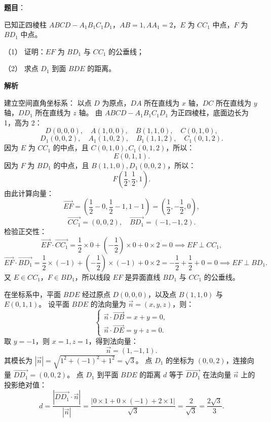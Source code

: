 \begin{answer}

\textbf{题目}：

已知正四棱柱 $ABCD - A_1B_1C_1D_1$，$AB = 1, AA_1 = 2$，$E$ 为 $CC_1$ 中点，$F$ 为 $BD_1$ 中点。

（1） 证明：$EF$ 为 $BD_1$ 与 $CC_1$ 的公垂线；

（2） 求点 $D_1$ 到面 $BDE$ 的距离。
\nopagebreak[4]
\begin{center}\end{center}
\nopagebreak[4]
\textbf{解析}


建立空间直角坐标系：
以点 $D$ 为原点，$DA$ 所在直线为 $x$ 轴，$DC$ 所在直线为 $y$ 轴，$DD_1$ 所在直线为 $z$ 轴。
由 $ABCD - A_1B_1C_1D_1$ 为正四棱柱，底面边长为 1，高为 2：
\nopagebreak[4]
\[D(0, 0, 0), \quad A(1, 0, 0), \quad B(1, 1, 0), \quad C(0, 1, 0),\]
\nopagebreak[4]
\[D_1(0, 0, 2), \quad A_1(1, 0, 2), \quad B_1(1, 1, 2), \quad C_1(0, 1, 2).\]
因为 $E$ 为 $CC_1$ 的中点，且 $C(0, 1, 0), C_1(0, 1, 2)$，所以：
\nopagebreak[4]
\[E(0, 1, 1).\]
因为 $F$ 为 $BD_1$ 的中点，且 $B(1, 1, 0), D_1(0, 0, 2)$，所以：
\nopagebreak[4]
\[F\left(\frac{1}{2}, \frac{1}{2}, 1\right).\]
由此计算向量：
\nopagebreak[4]
\[\vec{EF} = \left(\frac{1}{2} - 0, \frac{1}{2} - 1, 1 - 1\right) = \left(\frac{1}{2}, -\frac{1}{2}, 0\right),\]
\nopagebreak[4]
\[\vec{CC_1} = (0, 0, 2), \quad \vec{BD_1} = (-1, -1, 2).\]
检验正交性：
\nopagebreak[4]
\[\vec{EF} \cdot \vec{CC_1} = \frac{1}{2} \times 0 + \left(-\frac{1}{2}\right) \times 0 + 0 \times 2 = 0 \implies EF \perp CC_1,\]
\nopagebreak[4]
\[\vec{EF} \cdot \vec{BD_1} = \frac{1}{2} \times (-1) + \left(-\frac{1}{2}\right) \times (-1) + 0 \times 2 = -\frac{1}{2} + \frac{1}{2} + 0 = 0 \implies EF \perp BD_1.\]
又 $E \in CC_1$，$F \in BD_1$，所以线段 $EF$ 是异面直线 $BD_1$ 与 $CC_1$ 的公垂线。


在坐标系中，平面 $BDE$ 经过原点 $D(0, 0, 0)$，以及点 $B(1, 1, 0)$ 与 $E(0, 1, 1)$。
设平面 $BDE$ 的法向量为 $\vec{n} = (x, y, z)$，则：
\nopagebreak[4]
\[\begin{cases} \vec{n} \cdot \vec{DB} = x + y = 0, \\ \vec{n} \cdot \vec{DE} = y + z = 0. \end{cases}\]
取 $y = -1$，则 $x = 1, z = 1$，得到法向量：
\nopagebreak[4]
\[\vec{n} = (1, -1, 1).\]
其模长为 $|\vec{n}| = \sqrt{1^2 + (-1)^2 + 1^2} = \sqrt{3}$。
点 $D_1$ 的坐标为 $(0, 0, 2)$，连接向量 $\vec{DD_1} = (0, 0, 2)$。
点 $D_1$ 到平面 $BDE$ 的距离 $d$ 等于 $\vec{DD_1}$ 在法向量 $\vec{n}$ 上的投影绝对值：
\nopagebreak[4]
\[d = \frac{|\vec{DD_1} \cdot \vec{n}|}{|\vec{n}|} = \frac{|0 \times 1 + 0 \times (-1) + 2 \times 1|}{\sqrt{3}} = \frac{2}{\sqrt{3}} = \frac{2\sqrt{3}}{3}.\]


\end{answer}
